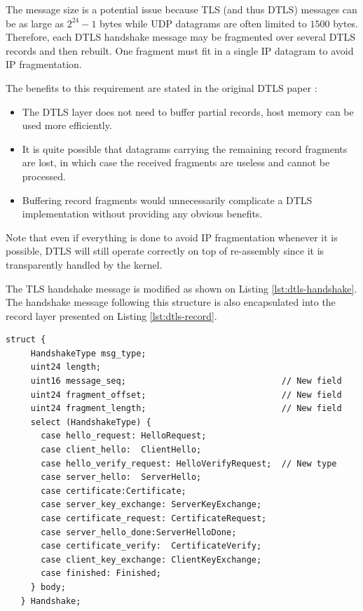 The message size is a potential issue because TLS (and thus DTLS) messages can be as large as $2^{24}-1$ bytes while UDP datagrams are often limited to $1500$ bytes. Therefore, each DTLS handshake message may be fragmented over several DTLS records and then rebuilt. One fragment must fit in a single IP datagram to avoid IP fragmentation.

The benefits to this requirement are stated in the original DTLS paper \cite{modadugu2004design} :
\begin{itemize}
\item The DTLS layer does not need to buffer partial records, host memory can be used more efficiently.
\item It is quite possible that datagrams carrying the remaining record fragments are lost, in which case the received fragments are useless and cannot be processed.
\item Buffering record fragments would unnecessarily complicate a DTLS implementation without providing any obvious benefits.
\end{itemize}

Note that even if everything is done to avoid IP fragmentation whenever it is possible, DTLS will still operate correctly on top of re-assembly since it is transparently handled by the kernel.

The TLS handshake message is modified as shown on Listing \ref{lst:dtls-handshake}. The handshake message following this structure is also encapsulated into the record layer presented on Listing \ref{lst:dtls-record}.

\begin{lstlisting}[caption=DTLS handshake message, label=lst:dtls-handshake]
   struct {
     HandshakeType msg_type;
     uint24 length;
     uint16 message_seq;                               // New field
     uint24 fragment_offset;                           // New field
     uint24 fragment_length;                           // New field
     select (HandshakeType) {
       case hello_request: HelloRequest;
       case client_hello:  ClientHello;
       case hello_verify_request: HelloVerifyRequest;  // New type
       case server_hello:  ServerHello;
       case certificate:Certificate;
       case server_key_exchange: ServerKeyExchange;
       case certificate_request: CertificateRequest;
       case server_hello_done:ServerHelloDone;
       case certificate_verify:  CertificateVerify;
       case client_key_exchange: ClientKeyExchange;
       case finished: Finished;
     } body;
   } Handshake;
\end{lstlisting}

